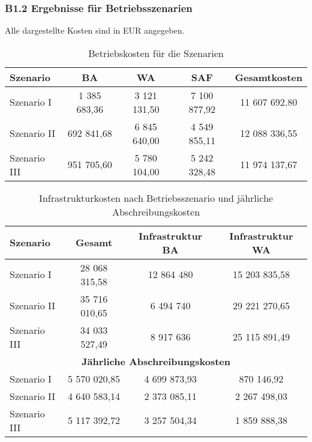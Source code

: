 \subsubsection{B1.2 Ergebnisse für Betriebsszenarien}
Alle dargestellte Kosten sind in EUR angegeben.
\begin{table}[h]
    \centering
    \caption{Betriebskosten für die Szenarien}
    \begin{tabular}{lcccc}
        \toprule
        \textbf{Szenario} & \textbf{BA} & \textbf{WA} & \textbf{SAF} & \textbf{Gesamtkosten} \\
        \midrule
        Szenario I   & 1 385 683,36  & 3 121 131,50  & 7 100 877,92  & 11 607 692,80 \\
        Szenario II  & 692 841,68    & 6 845 640,00  & 4 549 855,11  & 12 088 336,55 \\
        Szenario III & 951 705,60    & 5 780 104,00  & 5 242 328,48  & 11 974 137,67 \\
        \bottomrule
    \end{tabular}
    \label{tab:betriebsszenarien}
\end{table}

\begin{table}[h]
   \centering
    \caption{Infrastrukturkosten nach Betriebsszenario und jährliche Abschreibungskosten}
    \begin{tabular}{lccc}
        \toprule
        \textbf{Szenario} & \textbf{Gesamt} & \textbf{Infrastruktur BA} & \textbf{Infrastruktur WA} \\
        \midrule
        Szenario I   & 28 068 315,58 & 12 864 480  & 15 203 835,58 \\
        Szenario II  & 35 716 010,65 & 6 494 740   & 29 221 270,65 \\
        Szenario III & 34 033 527,49 & 8 917 636   & 25 115 891,49 \\
        \midrule
        \multicolumn{4}{c}{\textbf{Jährliche Abschreibungskosten}} \\
        \midrule
        Szenario I   & 5 570 020,85  & 4 699 873,93  & 870 146,92  \\
        Szenario II  & 4 640 583,14  & 2 373 085,11  & 2 267 498,03 \\
        Szenario III & 5 117 392,72  & 3 257 504,34  & 1 859 888,38 \\
        \bottomrule
    \end{tabular}
    \label{tab:szenario_analyse}
\end{table}